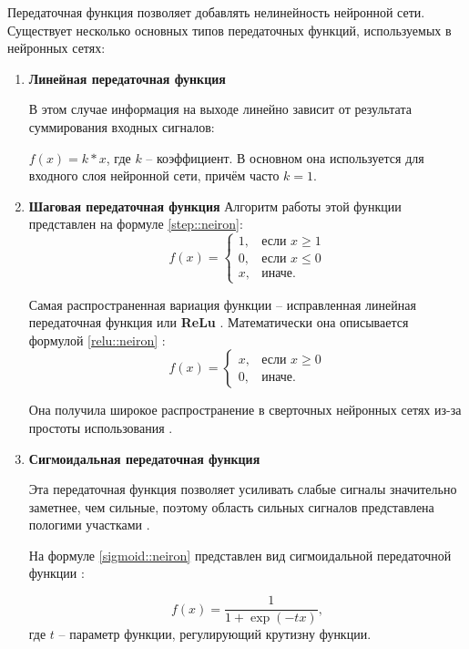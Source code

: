 Передаточная функция позволяет добавлять нелинейность нейронной сети.
Существует несколько основных типов передаточных функций, используемых в нейронных сетях:
\begin{enumerate}
	\item \textbf{Линейная передаточная функция}
	
	В этом случае информация на выходе линейно зависит от результата суммирования входных сигналов: 
	
	$f(x) = k*x$, где $k$ -- коэффициент.
	В основном она используется для входного слоя нейронной сети, причём часто $k = 1$.
	
	\item \textbf{Шаговая передаточная функция}
	Алгоритм работы этой функции представлен на формуле \eqref{step::neiron}:
	\begin{equation}
		\label{step::neiron}
		f(x)= 
		\begin{cases}
			1,& \text{если } x \geq 1\\
			0,& \text{если } x \leq 0\\
			x, & \text{иначе.}
		\end{cases}
	\end{equation}

	Самая распространенная вариация функции -- исправленная линейная передаточная функция или \textbf{ReLu} \cite{relu}.
	Математически она описывается формулой \eqref{relu::neiron} \cite{relu}:
	\begin{equation}
		\label{relu::neiron}
				f(x)= 
		\begin{cases}
			x,& \text{если } x \geq 0\\
			0,& \text{иначе.}
		\end{cases}
	\end{equation} 

	Она получила широкое распространение в сверточных нейронных сетях из-за простоты использования \cite{CNN_translate}.
	
	\item \textbf{Сигмоидальная передаточная функция}
	
	Эта передаточная функция позволяет усиливать слабые сигналы значительно заметнее, чем сильные, поэтому область сильных сигналов представлена пологими участками \cite{relu}.
	
	На формуле \eqref{sigmoid::neiron} представлен вид сигмоидальной передаточной функции \cite{CNN_translate}:
	
	\begin{equation}
		\label{sigmoid::neiron}
		f(x) = \frac{1}{1 + \exp(-tx)},
	\end{equation}
	где $t$ -- параметр функции, регулирующий крутизну функции.
	

\end{enumerate}
